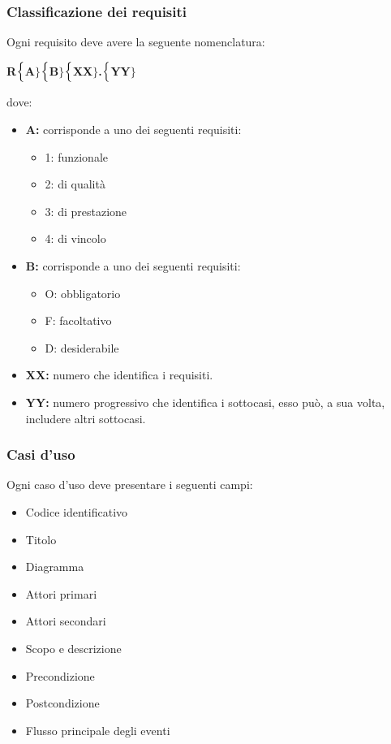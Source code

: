 \subsubsection{Classificazione dei requisiti}
Ogni requisito deve avere la seguente nomenclatura:
\begin{center}
	\textbf{R$\Bigl\{$A$\Bigr\}$$\Bigl\{$B$\Bigr\}$$\Bigl\{$XX$\Bigr\}$.$\Bigl\{$YY$\Bigr\}$}
\end{center}
dove:
\begin{itemize}
	\item \textbf{A:} corrisponde a uno dei seguenti requisiti:
	\begin{itemize}
		\item 1: funzionale
		\item 2: di qualità
		\item 3: di prestazione
		\item 4: di vincolo
	\end{itemize}
	\item \textbf{B:} corrisponde a uno dei seguenti requisiti:
	\begin{itemize}
		\item O: obbligatorio
		\item F: facoltativo
		\item D: desiderabile
	\end{itemize}
	\item \textbf{{XX}:} numero che identifica i requisiti.
	\item \textbf{{YY}:} numero progressivo che identifica i sottocasi, esso può, a sua volta, includere altri sottocasi.
\end{itemize}

\subsubsection{Casi d'uso}
Ogni caso d'uso deve presentare i seguenti campi:
\begin{itemize}
	\item Codice identificativo
	\item Titolo
	\item Diagramma
	\item Attori primari
	\item Attori secondari
	\item Scopo e descrizione
	\item Precondizione
	\item Postcondizione
	\item Flusso principale degli eventi
\end{itemize}

